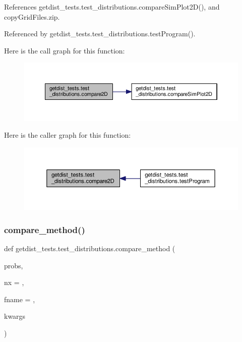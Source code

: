 References getdist\+\_\+tests.\+test\+\_\+distributions.\+compare\+Sim\+Plot2\+D(), and copy\+Grid\+Files.\+zip.



Referenced by getdist\+\_\+tests.\+test\+\_\+distributions.\+test\+Program().

Here is the call graph for this function\+:
\nopagebreak
\begin{figure}[H]
\begin{center}
\leavevmode
\includegraphics[width=350pt]{namespacegetdist__tests_1_1test__distributions_a26f4c8bf142c2c7fe7c5b0369c093bd1_cgraph}
\end{center}
\end{figure}
Here is the caller graph for this function\+:
\nopagebreak
\begin{figure}[H]
\begin{center}
\leavevmode
\includegraphics[width=350pt]{namespacegetdist__tests_1_1test__distributions_a26f4c8bf142c2c7fe7c5b0369c093bd1_icgraph}
\end{center}
\end{figure}
\mbox{\label{namespacegetdist__tests_1_1test__distributions_a6af1d23a030f9dc1de91037323596e1a}} 
\subsubsection{\texorpdfstring{compare\+\_\+method()}{compare\_method()}}
{\footnotesize\ttfamily def getdist\+\_\+tests.\+test\+\_\+distributions.\+compare\+\_\+method (\begin{DoxyParamCaption}\item[{}]{probs,  }\item[{}]{nx = {},  }\item[{}]{fname = {\ttfamily \textquotesingle{}\textquotesingle{}},  }\item[{}]{kwargs }\end{DoxyParamCaption})}



